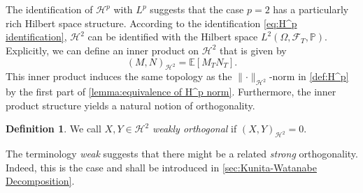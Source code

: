 \documentclass[11pt,a4paper,twoside,openany]{report}
\theoremstyle{plain} %
\theoremstyle{definition} %
\newtheorem{definition}[definition]{Definition}
\theoremstyle{remark} %
\begin{document}
\\\\
The identification of \(\mathcal{H}^p\) with \(L^p\) suggests that the case \(p=2\) has a particularly rich Hilbert space structure. According to the identification \cref{eq:H^p identification}, \(\mathcal{H}^2\) can be identified with the Hilbert space \(L^2(\Omega,\mathcal{F}_{T},\mathbb{P})\). Explicitly, we can define an inner product on \(\mathcal{H}^2\) that is given by 
\begin{equation}\label{eq:scalar product on H^2}
    (M,N)_{\mathcal{H}^2}=\mathbb{E}[M_{T}N_{T}].
\end{equation}
This inner product induces the same topology as the \(\lVert\cdot\rVert_{\mathcal{H}^2}\)-norm in \cref{def:H^p} by the first part of \cref{lemma:equivalence of H^p norm}. Furthermore, the inner product structure yields a natural notion of orthogonality. 
\begin{definition}\label{def:weak orthogonality}
    We call \(X,Y\in\mathcal{H}^2\) \textit{weakly orthogonal} if \((X,Y)_{\mathcal{H}^2}=0\).
\end{definition}
The terminology \textit{weak} suggests that there might be a related \textit{strong} orthogonality. Indeed, this is the case and shall be introduced in \cref{sec:Kunita-Watanabe Decomposition}.
\end{document}
